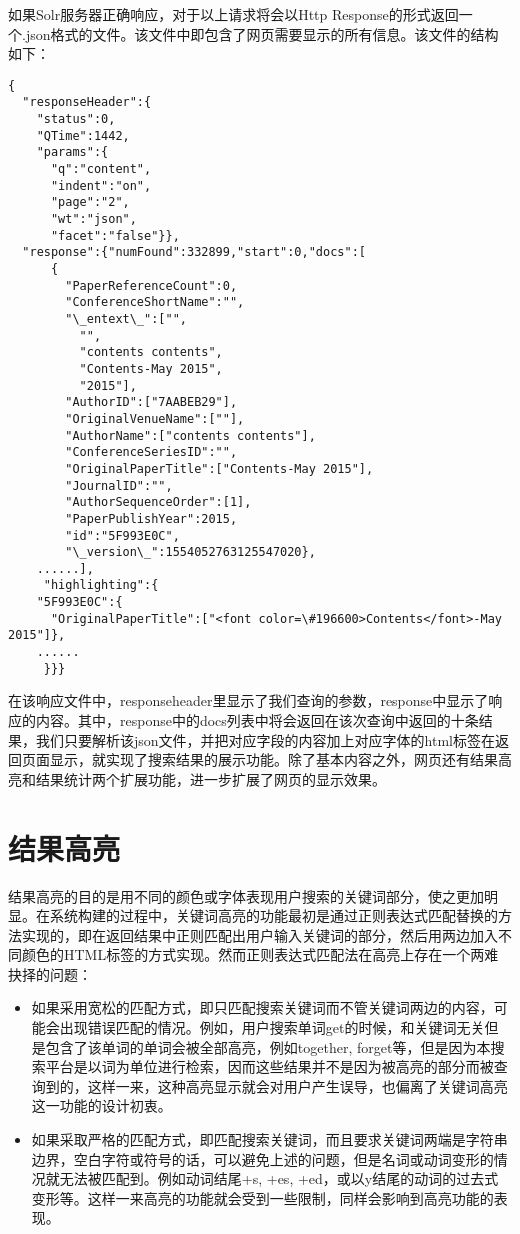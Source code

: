 如果Solr服务器正确响应，对于以上请求将会以Http Response的形式返回一个.json格式的文件。该文件中即包含了网页需要显示的所有信息。该文件的结构如下：

\begin{lstlisting}[caption={返回文件格式}, label=returnfileformat, escapeinside="", numbers=none]
{
  "responseHeader":{
    "status":0,
    "QTime":1442,
    "params":{
      "q":"content",
      "indent":"on",
      "page":"2",
      "wt":"json",
      "facet":"false"}},
  "response":{"numFound":332899,"start":0,"docs":[
      {
        "PaperReferenceCount":0,
        "ConferenceShortName":"",
        "\_entext\_":["",
          "",
          "contents contents",
          "Contents-May 2015",
          "2015"],
        "AuthorID":["7AABEB29"],
        "OriginalVenueName":[""],
        "AuthorName":["contents contents"],
        "ConferenceSeriesID":"",
        "OriginalPaperTitle":["Contents-May 2015"],
        "JournalID":"",
        "AuthorSequenceOrder":[1],
        "PaperPublishYear":2015,
        "id":"5F993E0C",
        "\_version\_":1554052763125547020},
    ......],
     "highlighting":{
    "5F993E0C":{
      "OriginalPaperTitle":["<font color=\#196600>Contents</font>-May 2015"]},
    ......
     }}}
\end{lstlisting}

在该响应文件中，responseheader里显示了我们查询的参数，response中显示了响应的内容。其中，response中的docs列表中将会返回在该次查询中返回的十条结果，我们只要解析该json文件，并把对应字段的内容加上对应字体的html标签在返回页面显示，就实现了搜索结果的展示功能。除了基本内容之外，网页还有结果高亮和结果统计两个扩展功能，进一步扩展了网页的显示效果。

\section{结果高亮}
结果高亮的目的是用不同的颜色或字体表现用户搜索的关键词部分，使之更加明显。在系统构建的过程中，关键词高亮的功能最初是通过正则表达式匹配替换的方法实现的，即在返回结果中正则匹配出用户输入关键词的部分，然后用两边加入不同颜色的HTML标签的方式实现。然而正则表达式匹配法在高亮上存在一个两难抉择的问题：

\begin{itemize}
\item 如果采用宽松的匹配方式，即只匹配搜索关键词而不管关键词两边的内容，可能会出现错误匹配的情况。例如，用户搜索单词get的时候，和关键词无关但是包含了该单词的单词会被全部高亮，例如together, forget等，但是因为本搜索平台是以词为单位进行检索，因而这些结果并不是因为被高亮的部分而被查询到的，这样一来，这种高亮显示就会对用户产生误导，也偏离了关键词高亮这一功能的设计初衷。
\item 如果采取严格的匹配方式，即匹配搜索关键词，而且要求关键词两端是字符串边界，空白字符或符号的话，可以避免上述的问题，但是名词或动词变形的情况就无法被匹配到。例如动词结尾+s, +es, +ed，或以y结尾的动词的过去式变形等。这样一来高亮的功能就会受到一些限制，同样会影响到高亮功能的表现。
\end{itemize}

